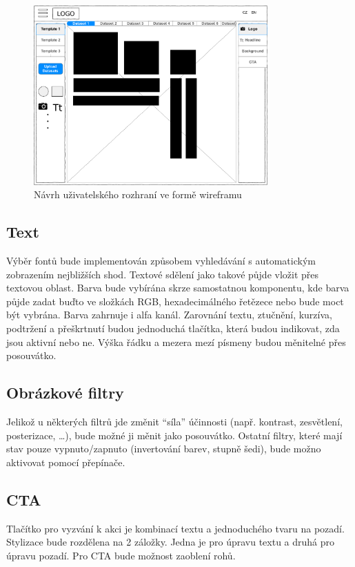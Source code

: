     \begin{figure}[ht]
        \centering
        \includegraphics[width=0.8\textwidth]{Figures/wireframe.pdf}
        \caption[Wireframe UI]{Návrh uživatelského rozhraní ve formě wireframu}
        \label{fig:ui-wireframe}
    \end{figure}

        \subsection{Text}
        Výběr fontů bude implementován způsobem vyhledávání s automatickým zobrazením nejbližších shod.
        Textové sdělení jako takové půjde vložit přes textovou oblast. Barva bude vybírána skrze samostatnou komponentu, kde barva půjde zadat buďto
        ve složkách RGB, hexadecimálného řetězece nebo bude moct být vybrána. Barva zahrnuje i alfa kanál.
        Zarovnání textu, ztučnění, kurzíva, podtržení a přeškrtnutí budou jednoduchá tlačítka, která budou indikovat, zda jsou aktivní nebo ne.
        Výška řádku a mezera mezí písmeny budou měnitelné přes posouvátko.

        \subsection{Obrázkové filtry}
        Jelikož u některých filtrů jde změnit \enquote{síla} účinnosti (např. kontrast, zesvětlení, posterizace, \ldots), bude možné ji měnit jako posouvátko.
        Ostatní filtry, které mají stav pouze vypnuto/zapnuto (invertování barev, stupně šedi), bude možno aktivovat pomocí přepínače.

        \subsection{CTA}
        Tlačítko pro vyzvání k akci je kombinací textu a jednoduchého tvaru na pozadí. Stylizace bude rozdělena na 2 záložky. Jedna je pro úpravu textu a
        druhá pro úpravu pozadí. Pro CTA bude možnost zaoblení rohů.

